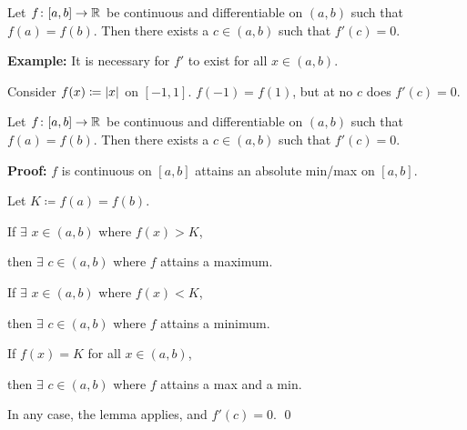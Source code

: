 \documentclass[10pt,aspectratio=149]{beamer}
\begin{document}
\begin{frame}
\begin{theorem}[Rolle]
Let $f \colon [a,b] \to {\mathbb{R}}$ be continuous and
differentiable on $(a,b)$ such that $f(a) = f(b)$.
Then there exists a $c \in (a,b)$ such that $f'(c) = 0$.
\end{theorem}

\pause
\begin{center}
\end{center}

\pause
\medskip

\textbf{Example:}
It is necessary for $f'$ to exist for all $x \in (a,b)$.

\pause
Consider $f(x) \coloneqq \left\lvert {x} \right\rvert$ on $[-1,1]$.
\quad
$f(-1) = f(1)$, but at no $c$ does $f'(c)=0$.
\end{frame}

\begin{frame}

\begin{theorem}[Rolle]
Let $f \colon [a,b] \to {\mathbb{R}}$ be continuous and
differentiable on $(a,b)$ such that $f(a) = f(b)$.
Then there exists a $c \in (a,b)$ such that $f'(c) = 0$.
\end{theorem}

\pause
\textbf{Proof:}
$f$ is continuous on $[a,b]$ \wthus attains an absolute min/max on $[a,b]$.

\pause
\medskip

Let $K \coloneqq f(a) = f(b)$.

\pause
\medskip

If $\exists$ $x \in (a,b)$ where $f(x) > K$,

\pause
then $\exists$ $c \in (a,b)$ where $f$ attains a maximum.

\pause
\medskip

If $\exists$ $x \in (a,b)$ where $f(x) < K$,

\pause
then $\exists$ $c \in (a,b)$ where $f$ attains a minimum.

\pause
\medskip

If $f(x) = K$ for all $x \in (a,b)$,

\pause
then $\exists$ $c \in (a,b)$ where $f$ attains a max and a min.

\pause
\medskip

In any case, the lemma applies, and $f'(c)=0$.
\qed

\end{frame}
\end{document}
